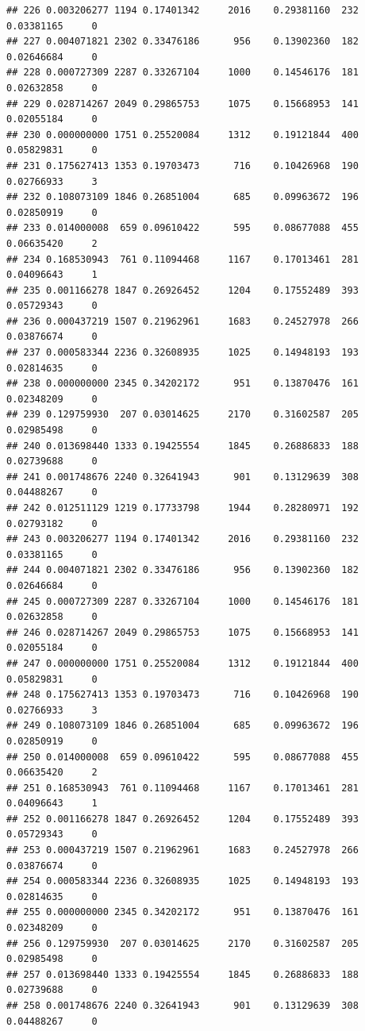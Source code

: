 \documentclass[
]{article}
\begin{document}
\begin{verbatim}
## 226 0.003206277 1194 0.17401342     2016    0.29381160  232 0.03381165     0
## 227 0.004071821 2302 0.33476186      956    0.13902360  182 0.02646684     0
## 228 0.000727309 2287 0.33267104     1000    0.14546176  181 0.02632858     0
## 229 0.028714267 2049 0.29865753     1075    0.15668953  141 0.02055184     0
## 230 0.000000000 1751 0.25520084     1312    0.19121844  400 0.05829831     0
## 231 0.175627413 1353 0.19703473      716    0.10426968  190 0.02766933     3
## 232 0.108073109 1846 0.26851004      685    0.09963672  196 0.02850919     0
## 233 0.014000008  659 0.09610422      595    0.08677088  455 0.06635420     2
## 234 0.168530943  761 0.11094468     1167    0.17013461  281 0.04096643     1
## 235 0.001166278 1847 0.26926452     1204    0.17552489  393 0.05729343     0
## 236 0.000437219 1507 0.21962961     1683    0.24527978  266 0.03876674     0
## 237 0.000583344 2236 0.32608935     1025    0.14948193  193 0.02814635     0
## 238 0.000000000 2345 0.34202172      951    0.13870476  161 0.02348209     0
## 239 0.129759930  207 0.03014625     2170    0.31602587  205 0.02985498     0
## 240 0.013698440 1333 0.19425554     1845    0.26886833  188 0.02739688     0
## 241 0.001748676 2240 0.32641943      901    0.13129639  308 0.04488267     0
## 242 0.012511129 1219 0.17733798     1944    0.28280971  192 0.02793182     0
## 243 0.003206277 1194 0.17401342     2016    0.29381160  232 0.03381165     0
## 244 0.004071821 2302 0.33476186      956    0.13902360  182 0.02646684     0
## 245 0.000727309 2287 0.33267104     1000    0.14546176  181 0.02632858     0
## 246 0.028714267 2049 0.29865753     1075    0.15668953  141 0.02055184     0
## 247 0.000000000 1751 0.25520084     1312    0.19121844  400 0.05829831     0
## 248 0.175627413 1353 0.19703473      716    0.10426968  190 0.02766933     3
## 249 0.108073109 1846 0.26851004      685    0.09963672  196 0.02850919     0
## 250 0.014000008  659 0.09610422      595    0.08677088  455 0.06635420     2
## 251 0.168530943  761 0.11094468     1167    0.17013461  281 0.04096643     1
## 252 0.001166278 1847 0.26926452     1204    0.17552489  393 0.05729343     0
## 253 0.000437219 1507 0.21962961     1683    0.24527978  266 0.03876674     0
## 254 0.000583344 2236 0.32608935     1025    0.14948193  193 0.02814635     0
## 255 0.000000000 2345 0.34202172      951    0.13870476  161 0.02348209     0
## 256 0.129759930  207 0.03014625     2170    0.31602587  205 0.02985498     0
## 257 0.013698440 1333 0.19425554     1845    0.26886833  188 0.02739688     0
## 258 0.001748676 2240 0.32641943      901    0.13129639  308 0.04488267     0

\end{verbatim}
\end{document}
